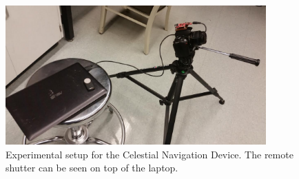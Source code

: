 \documentclass[12pt,a4paper]{book}
\begin{document}
\begin{figure}[!ht]%
\centering
 \includegraphics[width=10cm]{setup.png}
 \caption{Experimental setup for the Celestial Navigation Device.   The remote shutter can be seen on top of the laptop.}
 \label{f:setup}
\end{figure} 
\end{document}
